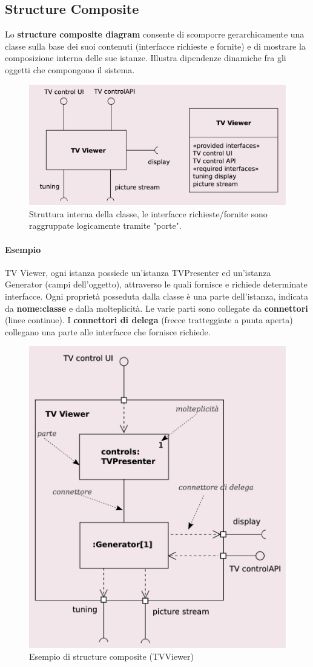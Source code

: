 \subsection{Structure Composite}

Lo \textbf{structure composite diagram} consente di scomporre gerarchicamente una classe sulla base dei suoi contenuti (interfacce richieste e fornite) e di mostrare la composizione interna delle sue istanze. Illustra dipendenze dinamiche fra gli oggetti che compongono il sistema.

\begin{figure}[h!]
    \centering
    \includegraphics[width=0.75\linewidth]{assets/UML/struct_comp/struct_comp.png}
    \caption{Struttura interna della classe, le interfacce richieste/fornite sono raggruppate logicamente tramite "porte".}
\end{figure}

\paragraph{Esempio} TV Viewer, ogni istanza possiede un'istanza TVPresenter ed un'istanza Generator (campi dell'oggetto), attraverso le quali fornisce e richiede determinate interfacce. Ogni proprietà posseduta dalla classe è una parte dell'istanza, indicata da \textbf{nome:classe} e dalla molteplicità. Le varie parti sono collegate da \textbf{connettori} (linee continue). I \textbf{connettori di delega} (frecce tratteggiate a punta aperta) collegano una parte alle interfacce che fornisce richiede.

\begin{figure}[h!]
    \centering
    \includegraphics[width=0.4\linewidth]{assets/UML/struct_comp/struct_comp2.png}
    \caption{Esempio di structure composite (TVViewer)}
\end{figure}

\newpage